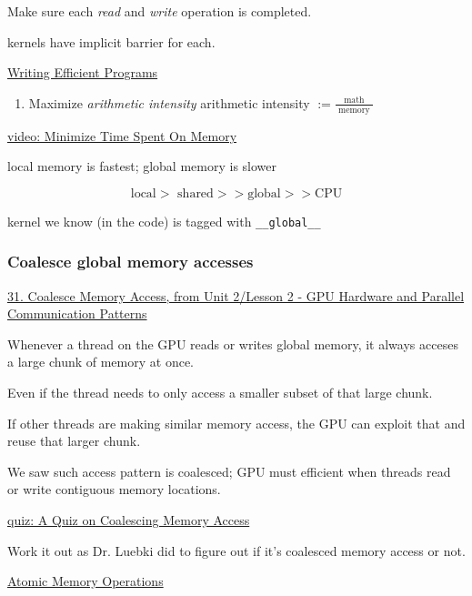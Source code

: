 \documentclass[10pt]{amsart}
\begin{document}
\begin{multicols*}{2}
Make sure each \emph{read} and \emph{write} operation is completed.  

kernels have implicit barrier for each.  

\href{https://classroom.udacity.com/courses/cs344/lessons/77202674/concepts/774332060923}{Writing Efficient Programs}

\begin{enumerate}
\item Maximize \emph{arithmetic intensity}
  arithmetic intensity $:= \frac{ \text{ math } }{ \text{ memory }}$
  \end{enumerate}

\href{https://classroom.udacity.com/courses/cs344/lessons/77202674/concepts/774332070923}{video: Minimize Time Spent On Memory}

local memory is fastest; global memory is slower

\[
\text{local} > \text{ shared} >> \text{global} >> \text{CPU}
\]

kernel we know (in the code) is tagged with \verb|__global__|




\subsubsection{Coalesce global memory accesses}

\href{https://classroom.udacity.com/courses/cs344/lessons/77202674/concepts/799933660923}{31. Coalesce Memory Access, from Unit 2/Lesson 2 - GPU Hardware and Parallel Communication Patterns}

Whenever a thread on the GPU reads or writes global memory, it always acceses a large chunk of memory at once.  

Even if the thread needs to only access a smaller subset of that large chunk.  

If other threads are making similar memory access, the GPU can exploit that and reuse that larger chunk.  

We saw such access pattern is coalesced; GPU must efficient when threads read or write contiguous memory locations.  


\href{https://classroom.udacity.com/courses/cs344/lessons/77202674/concepts/814086830923}{quiz: A Quiz on Coalescing Memory Access}

Work it out as Dr. Luebki did to figure out if it's coalesced memory access or not.  


\href{https://classroom.udacity.com/courses/cs344/lessons/77202674/concepts/774332150923}{Atomic Memory Operations}


\end{multicols*}
\end{document}
